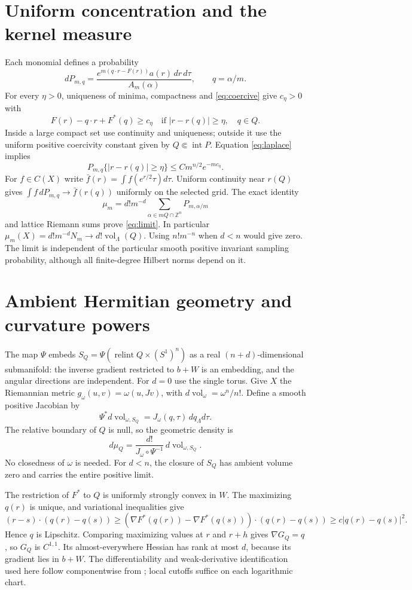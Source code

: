 \documentclass[11pt]{article}
\newcommand{\Z}{\mathbb Z}
\newcommand{\vol}{\operatorname{vol}}
\begin{document}
\section{Uniform concentration and the kernel measure}
Each monomial defines a probability
\[
 dP_{m,q}=\frac{e^{m(q\cdot r-F(r))}a(r)\,dr\,d\tau}
                         {A_m(\alpha)},\qquad q=\alpha/m.
\]
For every $\eta>0$, uniqueness of minima, compactness and
\eqref{eq:coercive} give $c_\eta>0$ with
\[
 F(r)-q\cdot r+F^*(q)\geq c_\eta
       \quad\text{if }|r-r(q)|\geq\eta,\quad q\in Q.
\]
Inside a large compact set use continuity and uniqueness; outside it
use the uniform positive coercivity constant given by
$Q\Subset\operatorname{int}P$. Equation \eqref{eq:laplace} implies
\[
 P_{m,q}\{|r-r(q)|\geq\eta\}\leq C m^{n/2}e^{-mc_\eta}.
\]
For $f\in C(X)$ write $\bar f(r)=\int f(e^{r/2}\tau)d\tau$.
Uniform continuity near $r(Q)$ gives
$\int f\,dP_{m,q}\to\bar f(r(q))$ uniformly on the selected grid.
The exact identity
\[
 \mu_m=d!m^{-d}\sum_{\alpha\in mQ\cap\Z^n}P_{m,\alpha/m}
\]
and lattice Riemann sums prove \eqref{eq:limit}. In particular
$\mu_m(X)=d!m^{-d}N_m\to d!\vol_\Lambda(Q)$.
Using $n!m^{-n}$ when $d<n$ would give zero. The limit is independent
of the particular smooth positive invariant sampling probability,
although all finite-degree Hilbert norms depend on it.

\section{Ambient Hermitian geometry and curvature powers}
The map $\Psi$ embeds
$S_Q=\Psi(\operatorname{relint}Q\times(S^1)^n)$ as a real
$(n+d)$-dimensional submanifold: the inverse gradient restricted to
$b+W$ is an embedding, and the angular directions are independent.
For $d=0$ use the single torus. Give $X$ the Riemannian metric
$g_\omega(u,v)=\omega(u,Jv)$, with
$d\vol_\omega=\omega^n/n!$. Define a smooth positive Jacobian by
\[
 \Psi^*d\vol_{\omega,S_Q}=J_\omega(q,\tau)\,dq_\Lambda d\tau.
\]
The relative boundary of $Q$ is null, so the geometric density is
\begin{equation}\label{eq:jacobian}
 d\mu_Q=\frac{d!}{J_\omega\circ\Psi^{-1}}\,d\vol_{\omega,S_Q}.
\end{equation}
No closedness of $\omega$ is needed. For $d<n$, the closure of
$S_Q$ has ambient volume zero and carries the entire positive limit.

The restriction of $F^*$ to $Q$ is uniformly strongly convex in $W$.
The maximizing $q(r)$ is unique, and variational inequalities give
\[
 (r-s)\cdot(q(r)-q(s))
 \geq(\nabla F^*(q(r))-\nabla F^*(q(s)))\cdot(q(r)-q(s))
 \geq c|q(r)-q(s)|^2.
\]
Hence $q$ is Lipschitz. Comparing maximizing values at $r$ and $r+h$
gives $\nabla G_Q=q$, so $G_Q$ is $C^{1,1}$. Its almost-everywhere
Hessian has rank at most $d$, because its gradient lies in $b+W$.
The differentiability and weak-derivative identification used here follow
componentwise from \cite[Theorems 3.28, 3.31 and Corollary 3.32]{Kinnunen};
local cutoffs suffice on each logarithmic chart.
\end{document}
